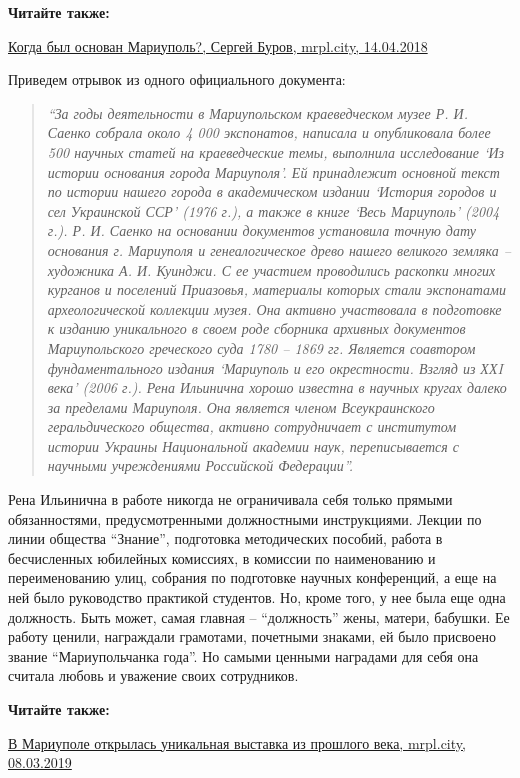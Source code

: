 \textbf{Читайте также:} 

\href{https://archive.org/details/14_04_2018.sergij_burov.mrpl_city.kogda_byl_osnovan_mariupol}{%
Когда был основан Мариуполь?, Сергей Буров, mrpl.city, 14.04.2018}

Приведем отрывок из одного официального документа: 

\begin{quote}
\em\enquote{За годы деятельности в
Мариупольском краеведческом музее Р. И. Саенко собрала около 4 000 экспонатов,
написала и опубликовала более 500 научных статей на краеведческие темы,
выполнила исследование \enquote{Из истории основания города Мариуполя}. Ей принадлежит
основной текст по истории нашего города в академическом издании \enquote{История
городов и сел Украинской ССР} (1976 г.), а также в книге \enquote{Весь Мариуполь} (2004
г.). Р. И. Саенко на основании документов установила точную дату основания г.
Мариуполя и генеалогическое древо нашего великого земляка – художника А. И.
Куинджи. С ее участием проводились раскопки многих курганов и поселений
Приазовья, материалы которых стали экспонатами археологической коллекции музея.
Она активно участвовала в подготовке к изданию уникального в своем роде
сборника архивных документов Мариупольского греческого суда 1780 – 1869 гг.
Является соавтором фундаментального издания \enquote{Мариуполь и его окрестности.
Взгляд из ХХI века} (2006 г.). Рена Ильинична хорошо известна в научных кругах
далеко за пределами Мариуполя. Она является членом Всеукраинского
геральдического общества, активно сотрудничает с институтом истории Украины
Национальной академии наук, переписывается с научными учреждениями Российской
Федерации}.
\end{quote}

Рена Ильинична в работе никогда не ограничивала себя только прямыми
обязанностями, предусмотренными должностными инструкциями. Лекции по линии
общества \enquote{Знание}, подготовка методических пособий, работа в бесчисленных
юбилейных комиссиях, в комиссии по наименованию и переименованию улиц, собрания
по подготовке научных конференций, а еще на ней было руководство практикой
студентов. Но, кроме того, у нее была еще одна должность. Быть может, самая
главная – \enquote{должность} жены, матери, бабушки. Ее работу ценили, награждали
грамотами, почетными знаками, ей было присвоено звание \enquote{Мариупольчанка года}.
Но самыми ценными наградами для себя она считала любовь и уважение своих
сотрудников.

\vspace{0.5cm}
\begin{minipage}{0.9\textwidth}
\textbf{Читайте также:} 

\href{https://archive.org/details/08_03_2019.mrpl_city.vystavka_muzej_kuindzhi}{%
В Мариуполе открылась уникальная выставка из прошлого века, mrpl.city, 08.03.2019}
\end{minipage}
\vspace{0.5cm}

